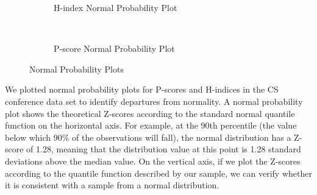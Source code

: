\documentclass[notitlepage]{svjour3}
\begin{document}
\begin{figure}[ht]
\centering
  \begin{subfigure}{.475\linewidth}
  \centering
 
    \caption{H-index Normal Probability Plot}
    \label{fig:hindex_normality}
  \end{subfigure}
  ~
  \begin{subfigure}{.475\linewidth}
    \caption{P-score Normal Probability Plot}
    \label{fig:pscore_normality}
  \end{subfigure}
  \caption{Normal Probability Plots}
\end{figure}

We plotted normal probability plots for P-scores and H-indices in the CS conference data set 
to identify departures from normality. A normal probability plot shows the theoretical Z-scores
according to the standard normal quantile function on the horizontal axis. For example, at the 90th
percentile (the value below which 90\% of the observations will fall), the normal distribution has a
Z-score of 1.28, meaning that the distribution value at this point is 1.28 standard deviations above 
the median value. On the vertical axis, if we plot the Z-scores according to the quantile function 
described by our sample, we can verify whether it is consistent with a sample from a normal distribution.
\end{document}
